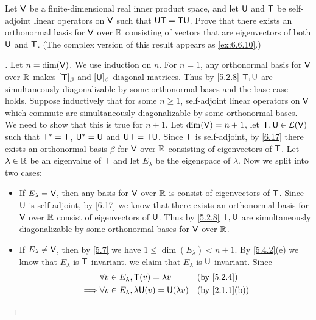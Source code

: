 \begin{ex}\label{ex:6.4.14}
	Let \(\mathsf{V}\) be a finite-dimensional real inner product space, and let \(\mathsf{U}\) and \(\mathsf{T}\) be self-adjoint linear operators on \(\mathsf{V}\) such that \(\mathsf{U} \mathsf{T} = \mathsf{T} \mathsf{U}\).
	Prove that there exists an orthonormal basis for \(\mathsf{V}\) over \(\mathbb{R}\) consisting of vectors that are eigenvectors of both \(\mathsf{U}\) and \(\mathsf{T}\).
	(The complex version of this result appears as \cref{ex:6.6.10}.)
\end{ex}

\begin{proof}[]
	Let \(n = \dim(\mathsf{V})\).
	We use induction on \(n\).
	For \(n = 1\), any orthonormal basis for \(\mathsf{V}\) over \(\mathbb{R}\) makes \([\mathsf{T}]_{\beta}\) and \([\mathsf{U}]_{\beta}\) diagonal matrices.
	Thus by \cref{5.2.8} \(\mathsf{T}, \mathsf{U}\) are simultaneously diagonalizable by some orthonormal bases and the base case holds.
	Suppose inductively that for some \(n \geq 1\), self-adjoint linear operators on \(\mathsf{V}\) which commute are simultaneously diagonalizable by some orthonormal bases.
	We need to show that this is true for \(n + 1\).
	Let \(\dim(\mathsf{V}) = n + 1\), let \(\mathsf{T}, \mathsf{U} \in \mathcal{L}(\mathsf{V})\) such that \(\mathsf{T}^* = \mathsf{T}\), \(\mathsf{U}^* = \mathsf{U}\) and \(\mathsf{U} \mathsf{T} = \mathsf{T} \mathsf{U}\).
	Since \(\mathsf{T}\) is self-adjoint, by \cref{6.17} there exists an orthonormal basis \(\beta\) for \(\mathsf{V}\) over \(\mathbb{R}\) consisting of eigenvectors of \(\mathsf{T}\).
	Let \(\lambda \in \mathbb{R}\) be an eigenvalue of \(\mathsf{T}\) and let \(E_{\lambda}\) be the eigenspace of \(\lambda\).
	Now we split into two cases:
	\begin{itemize}
		\item If \(E_{\lambda} = \mathsf{V}\), then any basis for \(\mathsf{V}\) over \(\mathbb{R}\) is consist of eigenvectors of \(\mathsf{T}\).
		      Since \(\mathsf{U}\) is self-adjoint, by \cref{6.17} we know that there exists an orthonormal basis for \(\mathsf{V}\) over \(\mathbb{R}\) consist of eigenvectors of \(\mathsf{U}\).
		      Thus by \cref{5.2.8} \(\mathsf{T}, \mathsf{U}\) are simultaneously diagonalizable by some orthonormal bases for \(\mathsf{V}\) over \(\mathbb{R}\).
		\item If \(E_{\lambda} \neq \mathsf{V}\), then by \cref{5.7} we have \(1 \leq \dim(E_{\lambda}) < n + 1\).
		      By \cref{5.4.2}(e) we know that \(E_{\lambda}\) is \(\mathsf{T}\)-invariant.
		      we claim that \(E_{\lambda}\) is \(\mathsf{U}\)-invariant.
		      Since
		      \begin{align*}
			               & \forall v \in E_{\lambda}, \T(v) = \lambda v             &  & \by{5.2.4}    \\
			      \implies & \forall v \in E_{\lambda}, \lambda \U(v) = \U(\lambda v) &  & \by{2.1.1}[b] \\

\end{align*}
\end{itemize}
\end{proof}
